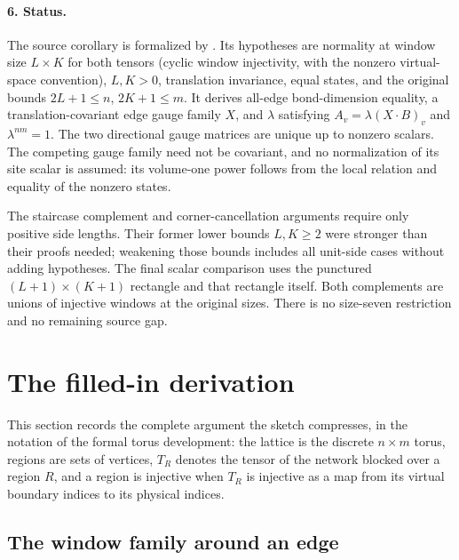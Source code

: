 \documentclass{article}
\begin{document}
\paragraph{6. Status.}
The source corollary is formalized by
.
Its hypotheses are normality at window size $L\times K$ for both tensors
(cyclic window injectivity, with the nonzero virtual-space convention),
$L,K>0$, translation invariance, equal states,
and the original bounds $2L+1\leq n$, $2K+1\leq m$.
It derives all-edge bond-dimension equality, a translation-covariant edge
gauge family $X$, and $\lambda$ satisfying
$A_v=\lambda(X\cdot B)_v$ and $\lambda^{nm}=1$.
The two directional gauge matrices are unique up to nonzero scalars.
The competing gauge family need not be covariant, and no normalization
of its site scalar is assumed: its volume-one power follows from the
local relation and equality of the nonzero states.

The staircase complement and corner-cancellation arguments require only
positive side lengths. Their former lower bounds $L,K\geq2$ were stronger
than their proofs needed; weakening those bounds includes all unit-side
cases without adding hypotheses. The final scalar comparison uses the
punctured $(L+1)\times(K+1)$ rectangle and that rectangle itself.
Both complements are unions of injective windows at the original sizes.
There is no size-seven restriction and no remaining source gap.

\section{The filled-in derivation}

This section records the complete argument the sketch compresses, in the
notation of the formal torus development: the lattice is the discrete
$n \times m$ torus, regions are sets of vertices, $T_R$ denotes the
tensor of the network blocked over a region $R$, and a region is
injective when $T_R$ is injective as a map from its virtual boundary
indices to its physical indices.

\subsection{The window family around an edge}
\end{document}
